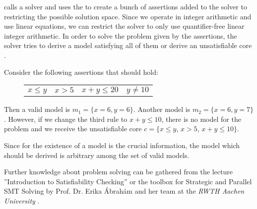 \aprove calls a solver and uses the \smtfactory to create a bunch of assertions added to the solver to restricting the possible solution space. Since we operate in integer arithmetic and use linear equations, we can restrict the solver to only use quantifier-free linear integer arithmetic. In order to solve the problem given by the assertions, the solver tries to derive a model satisfying all of them or derive an unsatisfiable core \cite{sat2016}.\newline

\begin{example}
	Consider the following assertions that should hold:\newline
	\vspace{-1em}
	\begin{figure}[H]
		\centering
		\begin{tabular}{cccc}
			$x \le y$ &	$x > 5 $ &	$ x+ y \le 20$ &$y \neq 10$ \\
		\end{tabular}
	\end{figure}
	\vspace{-1em}
	Then a valid model is $m_1 = \{x=6, y=6\}$. Another model is $m_2 = \{x=6, y=7\}$.
	However, if we change the third rule to $x+y\le 10$, there is no model for the problem and we receive the unsatisfiable core $c= \{x \le y$, $x > 5$, $x+ y \le 10 \}$.
\end{example}

Since for  the existence of a model is the crucial information, the model which should be derived is arbitrary among the set of valid models.

Further knowledge about  problem solving can be gathered from the lecture ''Introduction to Satisfiability Checking'' or the  toolbox for Strategic and Parallel SMT Solving by Prof. Dr. Erika Ábrahám and her team at the \textit{RWTH Aachen University} \cite{corzilius2015smt}.
